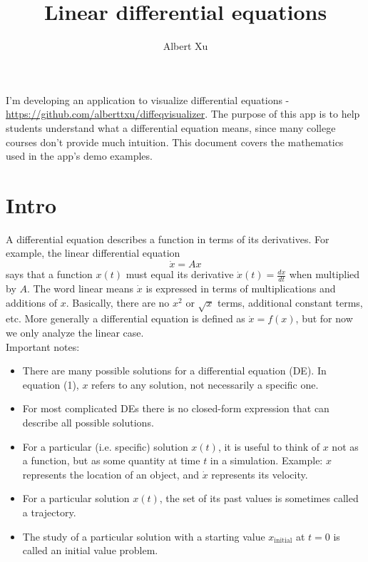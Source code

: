 \documentclass[11pt, oneside]{article}   	%
\title{Linear differential equations}
\author{Albert Xu}
\begin{document}
\maketitle

I'm developing an application to visualize differential equations - \url{https://github.com/alberttxu/diffeqvisualizer}.
The purpose of this app is to help students understand what a differential equation means,
since many college courses don't provide much intuition.
This document covers the mathematics used in the app's demo examples.

\section{Intro}

A differential equation describes a function in terms of its derivatives.
For example, the linear differential equation
\begin{equation}
\dot{x} = Ax
\end{equation}
says that a function $x(t)$ must equal its derivative $\dot{x}(t) = \frac{dx}{dt}$ when multiplied by $A$.
The word linear means $\dot{x}$ is expressed in terms of multiplications and additions of $x$.
Basically, there are no $x^2$ or $\sqrt{x}$ terms, additional constant terms, etc.
More generally a differential equation is defined as $\dot{x} = f(x)$,
but for now we only analyze the linear case.  \\

\noindent
Important notes:
\begin{itemize}
  \item There are many possible solutions for a differential equation (DE).
  In equation (1), $x$ refers to any solution, not necessarily a specific one.
  \item For most complicated DEs there is no closed-form expression that can describe all possible solutions.
  \item For a particular (i.e. specific) solution $x(t)$, it is useful to think of $x$ not as a function, but as some quantity at time $t$ in a simulation.
    \subitem Example: $x$ represents the location of an object, and $\dot{x}$ represents its velocity.
  \item For a particular solution $x(t)$, the set of its past values is sometimes called a trajectory.
  \item The study of a particular solution with a starting value $x_\mathrm{initial}$ at $t = 0$ is called an initial value problem.
\end{itemize}
\end{document}
